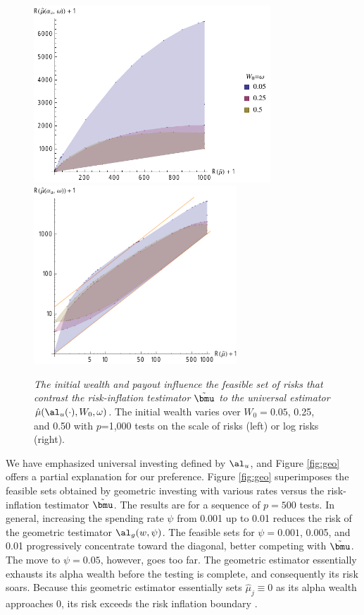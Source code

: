 \documentclass{gSCS2e}
\newcommand{\uTest}{\mbox{$\hat\mu(\al_u(\cdot),W_0,\omega)$}}
\begin{document}
\begin{figure}
 \caption{ \label{fig:univRI} {\sl The initial wealth and payout influence the 
  feasible set of risks that contrast the risk-inflation testimator $\tilde\bmu$  to the universal estimator
 \uTest.} The initial wealth varies over $W_0=0.05$,
 0.25, and 0.50 with $p$=1,000 tests on the scale of risks (left) or log risks
 (right).  }

 \vspace{0.1in}
 \centerline{
 \includegraphics[width=3.5in]{figures/univVsRI}
 \includegraphics[width=3.0in]{figures/univVsRILog}    }
 \vspace{0.2in}
\end{figure}


 We have emphasized universal investing defined by $\al_u$, and Figure
 \ref{fig:geo} offers a partial explanation for our preference.  Figure \ref{fig:geo}
 superimposes the feasible sets obtained by geometric investing with various rates versus
 the risk-inflation testimator $\tilde\bmu$.  The results are for a sequence of $p = 500$ tests.  In
 general, increasing the spending rate $\psi$ from 0.001 up to 0.01 reduces the risk of
 the geometric testimator $\al_g(w,\psi)$. The feasible sets for $\psi=0.001$, 0.005, and
 0.01 progressively concentrate toward the diagonal, better competing with $\tilde\bmu$.  
 The move to $\psi = 0.05$, however, goes too far.  The geometric estimator
 essentially exhausts its alpha wealth before the testing is complete, and consequently
 its risk soars.  Because this geometric estimator essentially sets $\hat\mu_j \equiv 0$
 as its alpha wealth approaches 0, its risk exceeds the risk inflation boundary
 .
\end{document}
